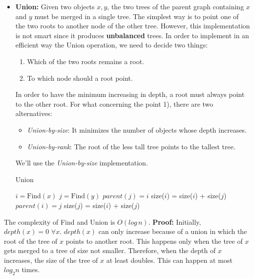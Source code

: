 \begin{itemize}
    \item \textbf{Union:} Given two objects $x, y$, the two trees of the parent graph containing $x$ and $y$ must be merged in a single tree. The simplest way is to point one of the two roots to another node of the other tree. However, this implementation is not smart since it produces \textbf{unbalanced} trees.\newline\newline
    In order to implement in an efficient way the Union operation, we need to decide two things:
    \begin{enumerate}
        \item Which of the two roots remains a root.
        \item To which node should a root point.
    \end{enumerate}
    In order to have the minimum increasing in depth, a root must always point to the other root. For what concerning the point 1), there are two alternatives:
    \begin{itemize}
        \item \textit{Union-by-size}: It minimizes the number of objects whose depth increases.

        \item \textit{Union-by-rank}: The root of the less tall tree points to the tallest tree.
    \end{itemize}
    We'll use the \textit{Union-by-size} implementation.
    \begin{algorithm}
    \caption{Union}\label{union}
        \begin{algorithmic}[1]
            \State $i = \text{Find}(x)$
            \State $j = \text{Find}(y)$
                \Return
            \EndIf
                \State $parent(j) = i$
                \State size($i$) = size($i$) + size($j$)
            \Else
                \State $parent(i) = j$
                \State size($j$) = size($i$) + size($j$)
            \EndIf
        \EndProcedure
        \end{algorithmic}
    \end{algorithm}
\end{itemize}
The complexity of Find and Union is $O(log\,n)$.\newline\newline
\textbf{Proof:}\newline
Initially, $depth(x) = 0 \,\, \forall x$. $depth(x)$ can only increase because of a union in which the root of the tree of $x$ points to another root. This happens only when the tree of $x$ gets merged to a tree of size not smaller. Therefore, when the depth of $x$ increases, the size of the tree of $x$ at least doubles. This can happen at most $log_{2} n$ times.
